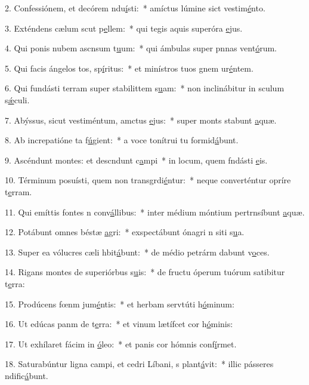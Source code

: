 2. Confessiónem, et decórem ndu\uline{í}sti:~* amíctus lúmine sict vestim\uline{é}nto.\par 
3. Exténdens cælum scut p\uline{e}llem:~* qui tegis aquis superóra \uline{e}jus.\par 
4. Qui ponis nubem ascnsum t\uline{u}um:~* qui ámbulas super pnnas vent\uline{ó}rum.\par 
5. Qui facis ángelos tos, sp\uline{í}ritus:~* et minístros tuos gnem ur\uline{é}ntem.\par 
6. Qui fundásti terram super stabilittem s\uline{u}am:~* non inclinábitur in sculum s\uline{ǽ}culi.\par 
7. Abýssus, sicut vestiméntum, amctus \uline{e}jus:~* super monts stabunt \uline{a}quæ.\par 
8. Ab increpatióne ta f\uline{ú}gient:~* a voce tonítrui tu formid\uline{á}bunt.\par 
9. Ascéndunt montes: et descndunt c\uline{a}mpi~* in locum, quem fndásti \uline{e}is.\par 
10. Términum posuísti, quem non transgrdi\uline{é}ntur:~* neque converténtur opríre t\uline{e}rram.\par 
11. Qui emíttis fontes n conv\uline{á}llibus:~* inter médium móntium pertrnsíbunt \uline{a}quæ.\par 
12. Potábunt omnes béstæ \uline{a}gri:~* exspectábunt ónagri n siti s\uline{u}a.\par 
13. Super ea vólucres cæli hbit\uline{á}bunt:~* de médio petrárm dabunt v\uline{o}ces.\par 
14. Rigans montes de superiórbus s\uline{u}is:~* de fructu óperum tuórum satibitur t\uline{e}rra:\par 
15. Prodúcens fœnm jum\uline{é}ntis:~* et herbam servtúti h\uline{ó}minum:\par 
16. Ut edúcas panm de t\uline{e}rra:~* et vinum lætífcet cor h\uline{ó}minis:\par 
17. Ut exhílaret fácim in \uline{ó}leo:~* et panis cor hómnis conf\uline{í}rmet.\par 
18. Saturabúntur ligna campi, et cedri Líbani, s plant\uline{á}vit:~* illic pásseres ndific\uline{á}bunt.\par 
